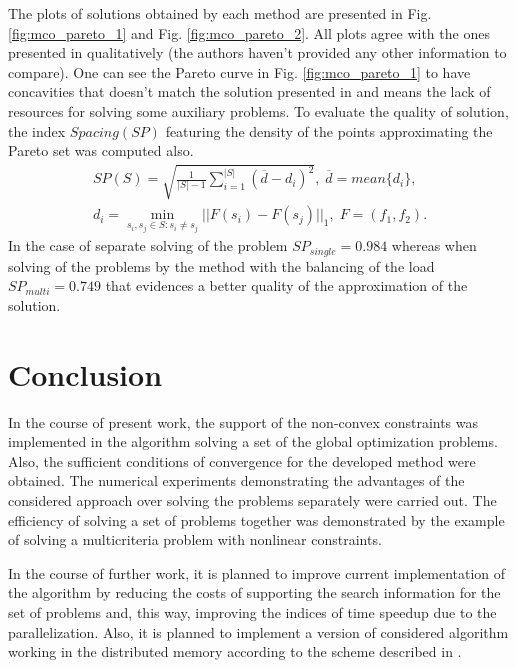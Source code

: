 \documentclass[runningheads]{llncs}
\begin{document}
The plots of solutions obtained by each method are presented in Fig. \ref{fig:mco_pareto_1}
and Fig. \ref{fig:mco_pareto_2}.
All plots agree with the ones presented in \cite{BinhKorn1999} qualitatively (the authors
haven't provided any other information to compare).
One can see the Pareto curve in Fig. \ref{fig:mco_pareto_1} to have concavities that doesn't
match the solution presented in \cite{BinhKorn1999} and means the lack of resources for
solving some auxiliary problems.
To evaluate the quality of solution, the index \(Spacing(SP)\) \cite{RiquelmeLucken2015}
featuring the density of the points approximating the Pareto set was computed also.
\begin{equation*}
\begin {array}{l}
  SP(S)=\sqrt{\frac{1}{|S|-1} \sum_{i=1}^{|S|} (\overline{d}-d_i)^2},
  \; \overline{d}=mean\{d_i\},
	\\d_i=\min_{s_i,s_j\in S:s_i\ne s_j}||F(s_i)-F(s_j)||_1,\; F=(f_1,f_2).
	\end{array}
\end{equation*}
In the case of separate solving of the problem \(SP_{single}=0.984\) whereas when solving of
the problems by the method with the balancing of the load \(SP_{multi}=0.749\) that evidences
a better quality of the approximation of the solution.

\section{Conclusion}

In the course of present work, the support of the non-convex constraints was implemented in the
algorithm solving a set of the global optimization problems.
Also, the sufficient conditions of convergence for the developed method were obtained.
The numerical experiments demonstrating the advantages of the considered approach over
solving the problems separately were carried out.
The efficiency of solving a set of problems together was demonstrated by the example of
solving a multicriteria problem with nonlinear constraints.

In the course of further work, it is planned to improve current implementation of the algorithm
by reducing the costs of supporting the search information for the set of problems and, this way,
improving the indices of time speedup due to the parallelization.
Also, it is planned to implement a version of considered algorithm working in the distributed
memory according to the scheme described in \cite{BarkalovLebedev2017_2}.

%
%
%


%
\end{document}

